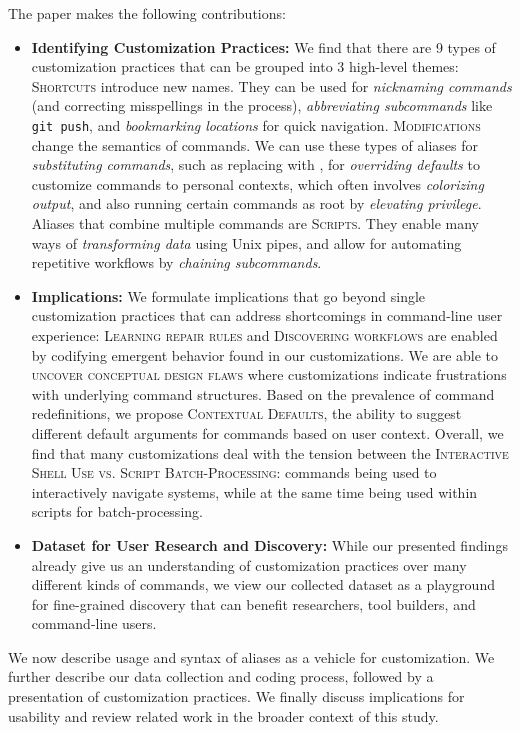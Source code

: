 \noindent The paper makes the following contributions:
\begin{itemize}[leftmargin=0.3cm]
	\item \textbf{Identifying Customization Practices:} We find that there are 9 types of customization practices that can be grouped into 3 high-level themes:
	\textsc{Shortcuts} introduce new names.
	They can be used for \emph{nicknaming commands} (and correcting misspellings in the process),
	\emph{abbreviating subcommands} like \texttt{git push},
	and \emph{bookmarking locations} for quick navigation.
	\textsc{Modifications} change the semantics of commands.
	We can use these types of aliases for \emph{substituting commands}, such as replacing  with ,
	for \emph{overriding defaults} to customize commands to personal contexts, 
	which often involves \emph{colorizing output},
	and also running certain commands as root by \emph{elevating privilege}.
	Aliases that combine multiple commands are \textsc{Scripts}.
	They enable many ways of \emph{transforming data} using Unix pipes, 
	and allow for automating repetitive workflows by \emph{chaining subcommands}.
	
	\item \textbf{Implications: } We formulate implications that go beyond single customization practices that can address shortcomings in command-line user experience:
	\textsc{Learning repair rules} and \textsc{Discovering workflows} are enabled by codifying emergent behavior found in our customizations. We are able to \textsc{uncover conceptual design flaws} where customizations indicate frustrations with underlying command structures.
	Based on the prevalence of command redefinitions, we propose \textsc{Contextual Defaults}, the ability to suggest different default arguments for commands based on user context.
	Overall, we find that many customizations deal with the tension between the \textsc{Interactive Shell Use vs. Script Batch-Processing}: commands being used to interactively navigate systems, while at the same time being used within scripts for batch-processing.
	
	\item \textbf{Dataset for User Research and Discovery:} While our presented findings already give us an understanding of customization practices over many different kinds of commands, we view our collected dataset as a playground for fine-grained discovery that can benefit researchers, tool builders, and command-line users.
	
\end{itemize}

We now describe usage and syntax of aliases as a vehicle for customization. We further describe our data collection and coding process, followed by a presentation of customization practices. We finally discuss implications for usability and review related work in the broader context of this study.